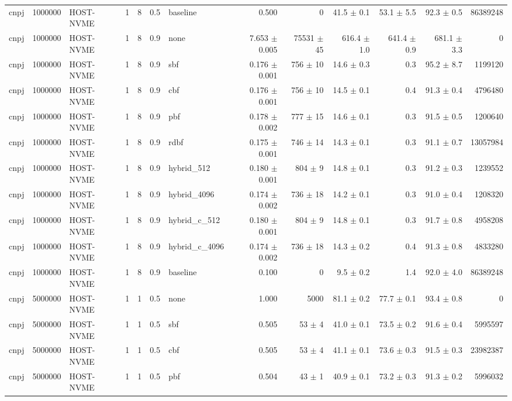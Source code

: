 \begin{tabular}{lllllllrrrrrr}
cnpj & 1000000 & HOST-NVME & 1 & 8 & 0.5 & baseline & 0.500 & 0 & 41.5 $\pm$ 0.1 & 53.1 $\pm$ 5.5 & 92.3 $\pm$ 0.5 & 86389248 \\
cnpj & 1000000 & HOST-NVME & 1 & 8 & 0.9 & none & 7.653 $\pm$ 0.005 & 75531 $\pm$ 45 & 616.4 $\pm$ 1.0 & 641.4 $\pm$ 0.9 & 681.1 $\pm$ 3.3 & 0 \\
cnpj & 1000000 & HOST-NVME & 1 & 8 & 0.9 & sbf & 0.176 $\pm$ 0.001 & 756 $\pm$ 10 & 14.6 $\pm$ 0.3 & 0.3 & 95.2 $\pm$ 8.7 & 1199120 \\
cnpj & 1000000 & HOST-NVME & 1 & 8 & 0.9 & cbf & 0.176 $\pm$ 0.001 & 756 $\pm$ 10 & 14.5 $\pm$ 0.1 & 0.4 & 91.3 $\pm$ 0.4 & 4796480 \\
cnpj & 1000000 & HOST-NVME & 1 & 8 & 0.9 & pbf & 0.178 $\pm$ 0.002 & 777 $\pm$ 15 & 14.6 $\pm$ 0.1 & 0.3 & 91.5 $\pm$ 0.5 & 1200640 \\
cnpj & 1000000 & HOST-NVME & 1 & 8 & 0.9 & rdbf & 0.175 $\pm$ 0.001 & 746 $\pm$ 14 & 14.3 $\pm$ 0.1 & 0.3 & 91.1 $\pm$ 0.7 & 13057984 \\
cnpj & 1000000 & HOST-NVME & 1 & 8 & 0.9 & hybrid\_512 & 0.180 $\pm$ 0.001 & 804 $\pm$ 9 & 14.8 $\pm$ 0.1 & 0.3 & 91.2 $\pm$ 0.3 & 1239552 \\
cnpj & 1000000 & HOST-NVME & 1 & 8 & 0.9 & hybrid\_4096 & 0.174 $\pm$ 0.002 & 736 $\pm$ 18 & 14.2 $\pm$ 0.1 & 0.3 & 91.0 $\pm$ 0.4 & 1208320 \\
cnpj & 1000000 & HOST-NVME & 1 & 8 & 0.9 & hybrid\_c\_512 & 0.180 $\pm$ 0.001 & 804 $\pm$ 9 & 14.8 $\pm$ 0.1 & 0.3 & 91.7 $\pm$ 0.8 & 4958208 \\
cnpj & 1000000 & HOST-NVME & 1 & 8 & 0.9 & hybrid\_c\_4096 & 0.174 $\pm$ 0.002 & 736 $\pm$ 18 & 14.3 $\pm$ 0.2 & 0.4 & 91.3 $\pm$ 0.8 & 4833280 \\
cnpj & 1000000 & HOST-NVME & 1 & 8 & 0.9 & baseline & 0.100 & 0 & 9.5 $\pm$ 0.2 & 1.4 & 92.0 $\pm$ 4.0 & 86389248 \\
cnpj & 5000000 & HOST-NVME & 1 & 1 & 0.5 & none & 1.000 & 5000 & 81.1 $\pm$ 0.2 & 77.7 $\pm$ 0.1 & 93.4 $\pm$ 0.8 & 0 \\
cnpj & 5000000 & HOST-NVME & 1 & 1 & 0.5 & sbf & 0.505 & 53 $\pm$ 4 & 41.0 $\pm$ 0.1 & 73.5 $\pm$ 0.2 & 91.6 $\pm$ 0.4 & 5995597 \\
cnpj & 5000000 & HOST-NVME & 1 & 1 & 0.5 & cbf & 0.505 & 53 $\pm$ 4 & 41.1 $\pm$ 0.1 & 73.6 $\pm$ 0.3 & 91.5 $\pm$ 0.3 & 23982387 \\
cnpj & 5000000 & HOST-NVME & 1 & 1 & 0.5 & pbf & 0.504 & 43 $\pm$ 1 & 40.9 $\pm$ 0.1 & 73.2 $\pm$ 0.3 & 91.3 $\pm$ 0.2 & 5996032 \\

\end{tabular}
